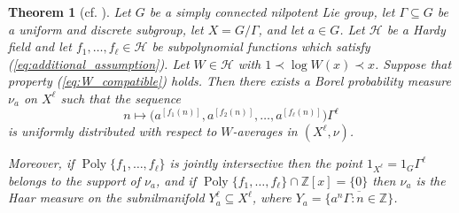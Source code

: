 \documentclass[12pt]{article}
\theoremstyle{plain} %
\newtheorem{theorem}{Theorem}[section]
\theoremstyle{definition} %
\theoremstyle{plain}
\theoremstyle{plain}
\numberwithin{equation}{section}
\newcommand{\Z}{\mathbb{Z}}
\renewcommand{\subset}{\subseteq}
\newcommand{\1}{\mathbbm{1}}
\newcommand{\Poly}{\operatorname{Poly}}
\newcommand{\round}[1]{[ #1 ]}
\begin{document}
\begin{theorem}[cf. {\cite[Theorem 5.7]{BMR24}}]\label{thm:BMR_uniform_distribution_result}
Let $G$ be a simply connected nilpotent Lie group, let
$\Gamma \subset G$ be a uniform and discrete subgroup, let
$X = G/\Gamma$, and let $a \in G$. Let $\mathcal{H}$ be a Hardy field and let $f_1,\ldots,f_{\ell} \in \mathcal{H}$ be subpolynomial functions which satisfy (\ref{eq:additional_assumption}). Let $W \in \mathcal{H}$ with $1 \prec \log W(x) \prec x$. Suppose that property (\ref{eq:W_compatible}) holds. Then there exists a Borel probability measure $\nu_a$ on
$X^{\ell}$ such that the sequence
\begin{equation}\label{eq:BMR_5.2}
n \mapsto \bigl(a^{ \round{f_1(n)}},
a^{ \round{f_2(n)}},\ldots,
a^{ \round{f_{\ell}(n)}}\bigr)\Gamma^{\ell}
\end{equation}
is uniformly distributed with respect to $W$-averages in $(X^{\ell},\nu)$.


Moreover, if $\Poly\{f_1,\dots, f_{\ell}\}$ is jointly intersective then the point
$1_{X^{\ell}} = 1_G\Gamma^{\ell}$ belongs to the support of $\nu_a$, and if $\Poly\{f_1,\dots, f_{\ell}\}\cap \Z[x]=\{0\}$ then $\nu_a$ is the Haar measure on the
subnilmanifold $Y_a^{\ell} \subset X^{\ell}$, where $Y_a = \overline{\{a^n\Gamma : n \in \mathbb{Z}\}}$.
\end{theorem}
\end{document}
